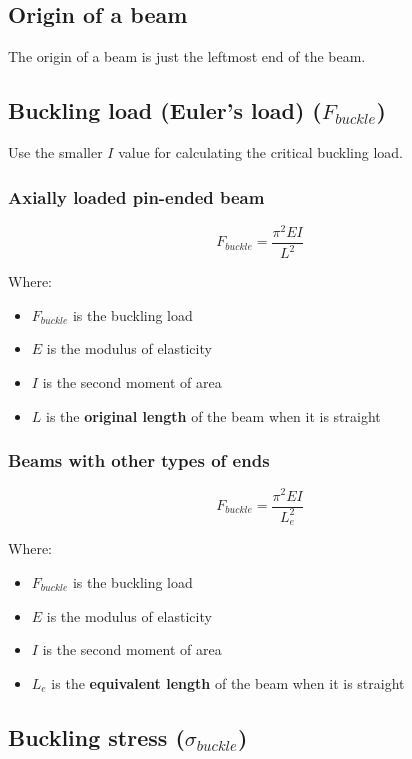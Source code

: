 \documentclass[11pt]{article}
\begin{document}
\subsection{Origin of a beam}
\label{sec:org5b10d17}
The origin of a beam is just the leftmost end of the beam.

\subsection{Buckling load (Euler's load) (\(F_{buckle}\))}
\label{sec:org41d8e2e}
Use the smaller \(I\) value for calculating the critical buckling load.

\subsubsection{Axially loaded pin-ended beam}
\label{sec:org039a743}
\[F_{buckle} = \frac{\pi^2 EI}{L^2}\]

Where:
\begin{itemize}
\item \(F_{buckle}\) is the buckling load
\item \(E\) is the modulus of elasticity
\item \(I\) is the second moment of area
\item \(L\) is the \textbf{original length} of the beam when it is straight
\end{itemize}

\subsubsection{Beams with other types of ends}
\label{sec:orgff12e43}
\[F_{buckle} = \frac{\pi^2 EI}{L_e^2}\]

Where:
\begin{itemize}
\item \(F_{buckle}\) is the buckling load
\item \(E\) is the modulus of elasticity
\item \(I\) is the second moment of area
\item \(L_e\) is the \textbf{equivalent length} of the beam when it is straight
\end{itemize}

\subsection{Buckling stress (\(\sigma_{buckle}\))}
\label{sec:orgaf6124b}
\end{document}
